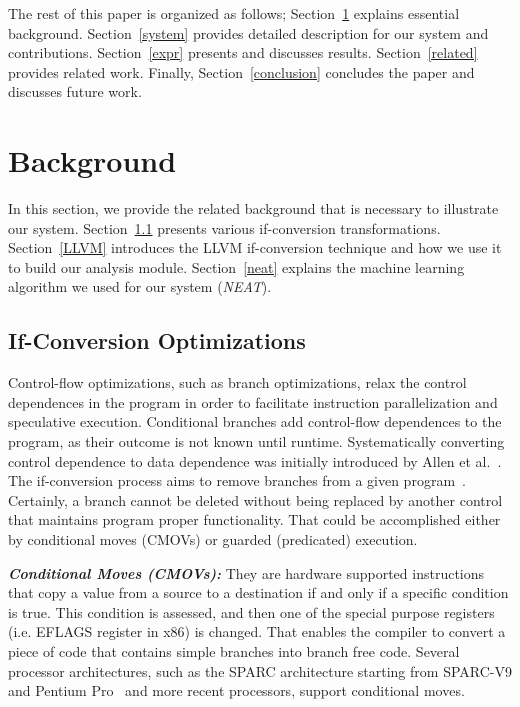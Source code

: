 \documentclass[preprint,nocopyrightspace]{sigplanconf}
\begin{document}
The rest of this paper is organized as follows; 
Section~\ref{background} explains essential background. Section~\ref{system} provides detailed description for our system and contributions.
Section~\ref{expr} presents and discusses results. Section~\ref{related} provides related work. Finally, Section~\ref{conclusion} concludes the paper and discusses future work.
\section{Background}
\label{background}
In this section, we provide the related background that is necessary to illustrate our system. Section~\ref{if_conv} presents various if-\-conversion transformations. Section~\ref{LLVM} introduces the LLVM if-\-conversion technique and how we use it to build our analysis module. Section~\ref{neat} explains the machine learning algorithm we used for our system (\textit{NEAT}).


\subsection{If-Conversion Optimizations}
\label{if_conv}
Control-flow optimizations, such as branch optimizations, relax the control dependences in the program in order to facilitate instruction parallelization and speculative execution. Conditional branches add control-flow dependences to the program, as their outcome is not known until runtime.
Systematically converting control dependence to data dependence was initially introduced by Allen et al.~\cite{Allen:1983:CCD:567067.567085}.
The if-conversion process aims to remove branches from a given program~\cite{OCMA02}. Certainly, a branch cannot be deleted without being replaced by another control that maintains program proper functionality. That could be accomplished either by conditional moves (CMOVs) or guarded (predicated) execution. 


\textbf{\textit{Conditional Moves (CMOVs):}}
They are hardware supported instructions that copy a value from a source to a destination if and only if a specific condition is true. This condition is assessed, and then one of the special purpose registers (i.e. EFLAGS register in x86) is changed.
That enables the compiler to convert a piece of code that contains simple branches into branch free code. Several processor architectures, such as the SPARC architecture starting from SPARC-V9 and Pentium Pro~\cite{ACDI97} and more recent processors, support conditional moves.
\end{document}

